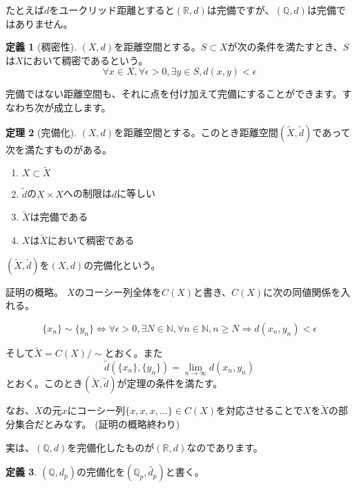 \documentclass[uplatex]{jsarticle}
\newcommand{\Q}{\mathbb{Q}}
\newcommand{\R}{\mathbb{R}}
\theoremstyle{definition} %
\newtheorem{thm}{定理}
\newtheorem{defi}[thm]{定義}
\begin{document}
たとえば$d$をユークリッド距離とすると$(\R, d)$は完備ですが、$(\Q, d)$は完備ではありません。

\begin{oframed}\begin{defi}[稠密性]
$(X, d)$を距離空間とする。$S \subset X$が次の条件を満たすとき、$S$は$X$において稠密であるという。
\[
\forall x \in X, \forall \epsilon > 0, \exists y \in S, d(x, y) < \epsilon
\]
\end{defi}\end{oframed}

完備ではない距離空間も、それに点を付け加えて完備にすることができます。すなわち次が成立します。

\begin{oframed}\begin{thm}[完備化]
$(X, d)$を距離空間とする。このとき距離空間$(\tilde{X}, \tilde{d})$であって次を満たすものがある。
\begin{enumerate}
\item $X \subset \tilde{X}$
\item $\tilde{d}$の$X \times X$への制限は$d$に等しい
\item $\tilde{X}$は完備である
\item $X$は$\tilde{X}$において稠密である
\end{enumerate}
$(\tilde{X}, \tilde{d})$を$(X,d)$の完備化という。
\end{thm}\end{oframed}
\noindent 証明の概略。
$X$のコーシー列全体を$C(X)$と書き、$C(X)$に次の同値関係を入れる。

\[\{x_n\} \sim \{y_n\} \iff \forall \epsilon > 0, \exists N \in \mathbb{N}, \forall n \in \mathbb{N}, n \geq N \Rightarrow d(x_n, y_n) < \epsilon\]

そして$\tilde{X} = C(X)/{\sim}$とおく。また
\[\tilde{d}(\{x_n\}, \{y_n\}) = \lim_{n\to\infty} d(x_n, y_n)\]
とおく。このとき$(\tilde{X}, \tilde{d})$が定理の条件を満たす。 

なお、$X$の元$x$にコーシー列$\{x, x, x, \dots\} \in C(X)$を対応させることで$X$を$\tilde{X}$の部分集合だとみなす。 (証明の概略終わり)

実は、$(\Q, d)$を完備化したものが$(\R, d)$なのであります。

\begin{oframed}\begin{defi}
$(\Q, d_p)$の完備化を$(\Q_p, \tilde{d_p})$と書く。
\end{defi}\end{oframed}
\end{document}
